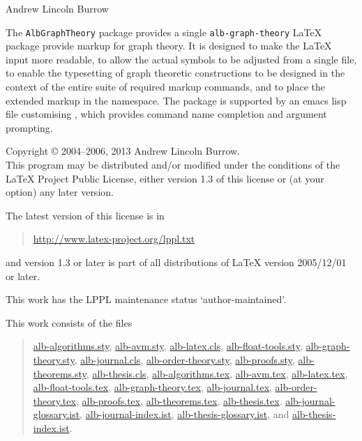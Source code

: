 \documentclass[11pt,a4paper,oneside,titlepage]{alb-latex}
\begin{document}


\begin{albTitlePage}


  Andrew Lincoln Burrow


  The \texttt{AlbGraphTheory} package provides a single
  \texttt{alb-graph-theory} \LaTeX{} package provide markup for graph
  theory.  It is designed to make the \LaTeX{} input more readable, to
  allow the actual symbols to be adjusted from a single file, to enable
  the typesetting of graph theoretic constructions to be designed in the
  context of the entire suite of required markup commands, and to place
  the extended markup in the \albLogo{} namespace.  The package is
  supported by an emacs lisp file customising \AUCTeX{}, which provides
  command name completion and argument prompting.



  Copyright \copyright{} 2004--2006, 2013 Andrew Lincoln Burrow.\\
  This program may be distributed and/or modified under the conditions
  of the \LaTeX{} Project Public License, either version 1.3 of this
  license or (at your option) any later version.

  \medskip{}

  The latest version of this license is in
  \begin{quote}
    \url{http://www.latex-project.org/lppl.txt}
  \end{quote}
  and version 1.3 or later is part of all distributions of LaTeX version
  2005/12/01 or later.

  \medskip{}

  This work has the LPPL maintenance status `author-maintained'.

  \medskip{}

  This work consists of the files
  \begin{quote}
    \begin{flushleft}
      \url{alb-algorithms.sty}, \url{alb-avm.sty}, \url{alb-latex.cls},
      \url{alb-float-tools.sty}, \url{alb-graph-theory.sty},
      \url{alb-journal.cls}, \url{alb-order-theory.sty},
      \url{alb-proofs.sty}, \url{alb-theorems.sty},
      \url{alb-thesis.cls}, \url{alb-algorithms.tex}, \url{alb-avm.tex},
      \url{alb-latex.tex}, \url{alb-float-tools.tex},
      \url{alb-graph-theory.tex}, \url{alb-journal.tex},
      \url{alb-order-theory.tex}, \url{alb-proofs.tex},
      \url{alb-theorems.tex}, \url{alb-thesis.tex}.
      \url{alb-journal-glossary.ist}, \url{alb-journal-index.ist},
      \url{alb-thesis-glossary.ist}, and \url{alb-thesis-index.ist}.
    \end{flushleft}
  \end{quote}



\end{albTitlePage}
\end{document}
